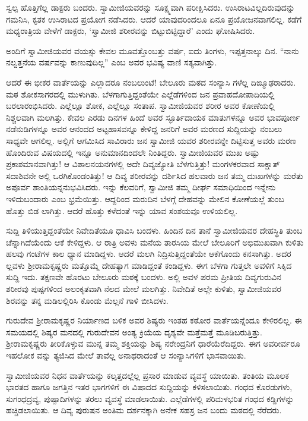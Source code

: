 ಸ್ವಲ್ಪ ಹೊತ್ತಿಗೆಲ್ಲ ಡಾಕ್ಟರು ಬಂದರು. ಸ್ವಾಮೀಜಿಯವರನ್ನು ಸೂಕ್ಷ್ಮವಾಗಿ ಪರೀಕ್ಷಿಸಿದರು. ಉಸಿರಾಟವಿಲ್ಲದಿರುವುದನ್ನು ಗಮನಿಸಿ, ಕೃತಕ ಉಸಿರಾಟದ ಪ್ರಯೋಗ ನಡೆಸಿದರು. ಆದರೆ ಯಾವುದರಿಂದಲೂ ಏನೂ ಪ್ರಯೋಜನವಾಗಲಿಲ್ಲ. ಕಡೆಗೆ ಮಧ್ಯರಾತ್ರಿಯ ವೇಳೆಗೆ ಡಾಕ್ಟರು, ‘ಸ್ವಾಮೀಜಿ ಶರೀರವನ್ನು ಬಿಟ್ಟುಬಿಟ್ಟಿದ್ದಾರೆ’ ಎಂದು ಘೋಷಿಸಿದರು.

ಅಂದಿಗೆ ಸ್ವಾಮೀಜಿಯವರ ವಯಸ್ಸು ಕೇವಲ ಮೂವತ್ತೊಂಬತ್ತು ವರ್ಷ, ಐದು ತಿಂಗಳು, ಇಪ್ಪತ್ತನಾಲ್ಕು ದಿನ. “ನಾನು ನಲ್ವತ್ತನೆಯ ವರ್ಷವನ್ನು ಕಾಣುವುದಿಲ್ಲ” ಎಂಬ ಅವರ ಭವಿಷ್ಯ ವಾಣಿ ಸತ್ಯವಾಗಿತ್ತು.

ಆದರೆ ಈ ಭೀಕರ ವಾರ್ತೆಯನ್ನು ಎಲ್ಲಾದರೂ ನಂಬಲುಂಟೆ! ಬೇಲೂರು ಮಠದ ಸಂನ್ಯಾಸಿ ಗಳೆಲ್ಲ ದಿಙ್ಮೂಢರಾದರು. ಮಠ ಶೋಕಸಾಗರದಲ್ಲಿ ಮುಳುಗಿತು. ಬೆಳಗಾಗುತ್ತಿದ್ದಂತೆಯೇ ಎಲ್ಲೆಡೆಗಳಿಂದ ಜನ ಪ್ರವಾಹದೋಪಾದಿಯಲ್ಲಿ ಬರಲಾರಂಭಿಸಿದರು. ಎಲ್ಲೆಲ್ಲೂ ಶೋಕ, ಎಲ್ಲೆಲ್ಲೂ ಸಂತಾಪ. ಸ್ವಾಮೀಜಿಯವರ ಶರೀರ ಅವರ ಕೋಣೆಯಲ್ಲಿ ನಿಶ್ಚಲವಾಗಿ ಮಲಗಿತ್ತು. ಕೇವಲ ಎರಡು ದಿನಗಳ ಹಿಂದೆ ಅವರ ಸ್ಫೂರ್ತಿದಾಯಕ ಮಾತುಗಳನ್ನೂ ಅವರ ಭಾವಪೂರ್ಣ ನಡೆನುಡಿಗಳನ್ನೂ ಅವರ ಆನಂದದ ಅಟ್ಟಹಾಸವನ್ನೂ ಕೇಳಿದ್ದ ಜನರಿಗೆ ಅವರ ಮರಣದ ಸುದ್ದಿಯನ್ನು ನಂಬಲು ಸಾಧ್ಯವೇ ಆಗಲಿಲ್ಲ. ಅಲ್ಲಿಗೆ ಆಗಮಿಸಿದ ಸಾವಿರಾರು ಜನ ಸ್ವಾಮೀಜಿ ಯವರ ಶರೀರವನ್ನೇ ದಿಟ್ಟಿಸುತ್ತ ಅವರು ಮರಣ ಹೊಂದಿರುವ ವಿಷಯದಲ್ಲಿ ಇನ್ನೂ ಅನುಮಾನದಿಂದಲೇ ನಿಂತಿದ್ದರು. ಸ್ವಾಮೀಜಿಯವರ ಮುಖ ಅಷ್ಟು ಪ್ರಕಾಶಮಾನವಾಗಿತ್ತು! ಆ ವಿಶಾಲನಯನಗಳಲ್ಲಿ ಅದೇ ದಿವ್ಯಜ್ಯೋತಿ ಬೆಳಗುತ್ತಿತ್ತು! ಮಂಗಳಕರವಾದ ಸಾಕ್ಷಾತ್ ಸದಾಶಿವನೇ ಅಲ್ಲಿ ಒರಗಿಕೊಂಡಂತಿತ್ತು! ಆ ದಿವ್ಯ ಶರೀರವನ್ನು ದರ್ಶಿಸಿದ ಹಲವಾರು ಜನ ತಮ್ಮ ದುಃಖಗಳನ್ನು ಮರೆತು ಅಪೂರ್ವ ಶಾಂತಿಯನ್ನನುಭವಿಸಿದರು. ಇನ್ನು ಕೆಲವರಿಗೆ, ಸ್ವಾಮೀಜಿ ತಮ್ಮ ದೀರ್ಘ ಸಮಾಧಿಯಿಂದ ಇನ್ನೇನು ಇಳಿದುಬಂದಾರು ಎಂಬ ಭ್ರಮೆಯಿತ್ತು. ಆದ್ದರಿಂದ ಮರುದಿನ ಬೆಳಗ್ಗೆ ದೇಹವನ್ನು ಮೇಲಿನ ಕೋಣೆಯಲ್ಲೆ ತುಂಬ ಹೊತ್ತು ಬಿಡ ಲಾಗಿತ್ತು. ಆದರೆ ಹೊತ್ತು ಕಳೆದಂತೆ ಇನ್ನು ಯಾವ ಸಂಶಯವೂ ಉಳಿಯಲಿಲ್ಲ.

ಸುದ್ದಿ ತಿಳಿಯುತ್ತಿದ್ದಂತೆಯೇ ನಿವೇದಿತೆಯೂ ಧಾವಿಸಿ ಬಂದಳು. ಹಿಂದಿನ ದಿನ ತಾನೆ ಸ್ವಾಮೀಜಿಯವರ ದೇಹಸ್ಥಿತಿ ತುಂಬ ಚೆನ್ನಾಗಿದೆಯೆಂದು ಆಕೆ ಕೇಳಿದ್ದಳು. ಆ ರಾತ್ರಿ ಅವಳು ಮನೆಯ ತಾರಸಿಯ ಮೇಲೆ ಬೇಲೂರಿಗೆ ಅಭಿಮುಖವಾಗಿ ಕುಳಿತು ಹಲವು ಗಂಟೆಗಳ ಕಾಲ ಧ್ಯಾನ ಮಾಡಿದ್ದಳು. ಆದರೆ ಮಲಗಿ ನಿದ್ರಿಸುತ್ತಿದ್ದಂತೆಯೇ ಆಕೆಗೊಂದು ಕನಸಾಗಿತ್ತು. ಅದರ ಲ್ಲವಳು ಶ್ರೀರಾಮಕೃಷ್ಣರು ಮತ್ತೊಮ್ಮೆ ದೇಹತ್ಯಾಗ ಮಾಡಿದ್ದಂತೆ ಕಂಡಿದ್ದಳು. ಈಗ ಬೆಳಗಾ ಗುತ್ತಲೇ ಅವಳಿಗೆ ಸಿಕ್ಕಿದ ಸುದ್ದಿ ಇದು. ತಕ್ಷಣವೇ ಹೊರಟು ಬೇಲೂರು ಮಠಕ್ಕೆ ಬಂದಳು. ಅಲ್ಲಿ ಅವಳ ಪರಮ ಪ್ರೀತಿಯ ದಿವ್ಯಗುರುವಿನ ಶರೀರವು ಪುಷ್ಪಗಳಿಂದ ಅಲಂಕೃತವಾಗಿ ನೆಲದ ಮೇಲೆ ಮಲಗಿತ್ತು. ನಿವೇದಿತೆ ಅಲ್ಲೇ ಕುಳಿತು, ಸ್ವಾಮೀಜಿಯವರ ಶಿರವನ್ನು ತನ್ನ ಮಡಿಲಲ್ಲಿರಿಸಿ ಕೊಂಡು ಮೆಲ್ಲನೆ ಗಾಳಿ ಬೀಸಿದಳು.

ಗುರುದೇವ ಶ್ರೀರಾಮಕೃಷ್ಣರ ನಿರ್ಯಾಣದ ಬಳಿಕ ಅವರ ಶಿಷ್ಯರು ಇಂತಹ ಕಠೋರ ವಾರ್ತೆಯನ್ನೆಂದೂ ಕೇಳಿರಲಿಲ್ಲ. ಈ ಸಮಯದಲ್ಲಿ ಶಿಷ್ಯರ ಮನದಲ್ಲಿ ಗುರುದೇವನ ಅಂತ್ಯ ಕ್ರಿಯೆಯ ದೃಶ್ಯವೇ ಮತ್ತೆಮತ್ತೆ ಮೂಡಿಬರುತ್ತಿತ್ತು. ಶ್ರೀರಾಮಕೃಷ್ಣರು ತೀರಿಕೊಳ್ಳುವ ಮುನ್ನ ತಮ್ಮ ಶಕ್ತಿಯನ್ನು ಶಿಷ್ಯ ನರೇಂದ್ರನಿಗೆ ಧಾರೆಯೆರೆದಿದ್ದರು. ಈಗ ಅವರೀರ್ವರೂ ಇಹಲೋಕ ವನ್ನು ತ್ಯಜಿಸಿದ ಮೇಲೆ ತಾವೆಲ್ಲ ಅನಾಥರಾದಂತೆ ಆ ಸಂನ್ಯಾಸಿಗಳಿಗೆ ಭಾಸವಾಯಿತು.

ಸ್ವಾಮೀಜಿಯವರ ನಿಧನ ವಾರ್ತೆಯನ್ನು ಕಲ್ಕತ್ತದಲ್ಲೆಲ್ಲ ಪ್ರಸಾರ ಮಾಡುವ ವ್ಯವಸ್ಥೆ ಯಾಯಿತು. ತಂತಿಯ ಮೂಲಕ ಭಾರತದ ಹಾಗೂ ಜಗತ್ತಿನ ಇತರ ಭಾಗಗಳಿಗೆ ಈ ವಿಷಾದದ ಸುದ್ದಿಯನ್ನು ಕಳಿಸಲಾಯಿತು. ಗಂಧದ ಕೊರಡುಗಳು, ಸುಗಂಧದ್ರವ್ಯ, ಪುಷ್ಪಾದಿಗಳನ್ನು ತರಲು ವ್ಯವಸ್ಥೆ ಮಾಡಲಾಯಿತು. ಎಲ್ಲೆಡೆಗಳಲ್ಲಿ ಪರಿಮಳಭರಿತ ಗಂಧದ ಕಡ್ಡಿಗಳನ್ನು ಹಚ್ಚಿಡಲಾಯಿತು. ಆ ದಿವ್ಯ ಪುರುಷನ ಅಂತಿಮ ದರ್ಶನಕ್ಕಾಗಿ ಅನೇಕ ಸಹಸ್ರ ಜನ ಬಂದು ಮಠದಲ್ಲಿ ನೆರೆದರು.

